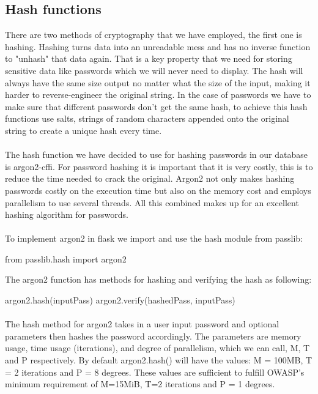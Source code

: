 \subsection{Hash functions}
There are two methods of cryptography that we have employed, the first one is hashing. Hashing turns data into an unreadable mess and has no inverse function to "unhash" that data again. That is a key property that we need for storing sensitive data like passwords which we will never need to display. The hash will always have the same size output no matter what the size of the input, making it harder to reverse-engineer the original string. In the case of passwords we have to make sure that different passwords don't get the same hash, to achieve this hash functions use salts, strings of random characters appended onto the original string to create a unique hash every time. 
\paragraph{}
The hash function we have decided to use for hashing passwords in our database is argon2-cffi. For password hashing it is important that it is very costly, this is to reduce the time needed to crack the original. Argon2 not only makes hashing passwords costly on the execution time but also on the memory cost and employs parallelism to use several threads. All this combined makes up for an excellent hashing algorithm for passwords.
\paragraph{}
To implement argon2 in flask we import and use the hash module from passlib:
\begin{python}
from passlib.hash import argon2
\end{python}
The argon2 function has methods for hashing and verifying the hash as following:
\begin{python}
argon2.hash(inputPass)
argon2.verify(hashedPass, inputPass)
\end{python}
\paragraph{}
The hash method for argon2 takes in a user input password and optional parameters then hashes the password accordingly. The parameters are memory usage, time usage (iterations), and degree of parallelism, which we can call, M, T and P respectively. By default argon2.hash() will have the values: M = 100MB, T = 2 iterations and P = 8 degrees. These values are sufficient to fulfill OWASP's minimum requirement of M=15MiB, T=2 iterations and P = 1 degrees. 
